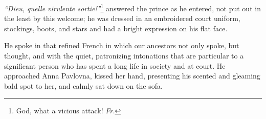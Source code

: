 \textit{``Dieu, quelle virulente sortie!''}\footnote{God, what a
  vicious attack! \textit{Fr.}} answered the prince as he entered, not
put out in the least by this welcome; he was dressed in an embroidered
court uniform, stockings, boots, and stars and had a bright expression
on his flat face.

He spoke in that refined French in which our ancestors not only spoke,
but thought, and with the quiet, patronizing intonations that are
particular to a significant person who has spent a long life in
society and at court. He approached Anna Pavlovna, kissed her hand,
presenting his scented and gleaming bald spot to her, and calmly sat
down on the sofa.

